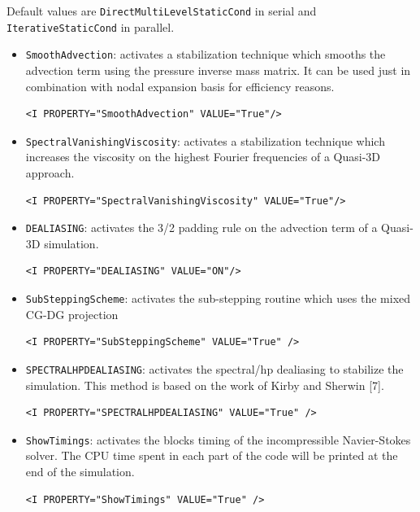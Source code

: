 Default values are \texttt{DirectMultiLevelStaticCond} in serial and \texttt{IterativeStaticCond} in parallel.

\begin{itemize}
\item \texttt{SmoothAdvection}: activates a stabilization technique which smooths the advection term using the pressure inverse mass matrix. It can be used just in combination with nodal expansion basis for efficiency reasons.

\begin{lstlisting}[style=XMLStyle]
<I PROPERTY="SmoothAdvection" VALUE="True"/>
\end{lstlisting}


\item \texttt{SpectralVanishingViscosity}: activates a stabilization technique which increases the viscosity on the highest Fourier frequencies of a Quasi-3D approach.
\begin{lstlisting}[style=XMLStyle]
<I PROPERTY="SpectralVanishingViscosity" VALUE="True"/>
\end{lstlisting}

\item \texttt{DEALIASING}: activates the 3/2 padding rule on the advection term of a Quasi-3D simulation. 
\begin{lstlisting}[style=XMLStyle]
<I PROPERTY="DEALIASING" VALUE="ON"/>
\end{lstlisting}

\item \texttt{SubSteppingScheme}: activates the sub-stepping routine which uses the mixed CG-DG projection
\begin{lstlisting}[style=XMLStyle]
<I PROPERTY="SubSteppingScheme" VALUE="True" />
\end{lstlisting}

\item \texttt{SPECTRALHPDEALIASING}: activates the spectral/hp dealiasing to stabilize the simulation. This method is based on the work of Kirby and Sherwin [7].  
\begin{lstlisting}[style=XMLStyle]
<I PROPERTY="SPECTRALHPDEALIASING" VALUE="True" />
\end{lstlisting}

\item \texttt{ShowTimings}: activates the blocks timing of the incompressible Navier-Stokes solver. The CPU time spent in each part of the code will be printed at the end of the simulation. 

\begin{lstlisting}[style=XMLStyle]
<I PROPERTY="ShowTimings" VALUE="True" />
\end{lstlisting}

\end{itemize}

